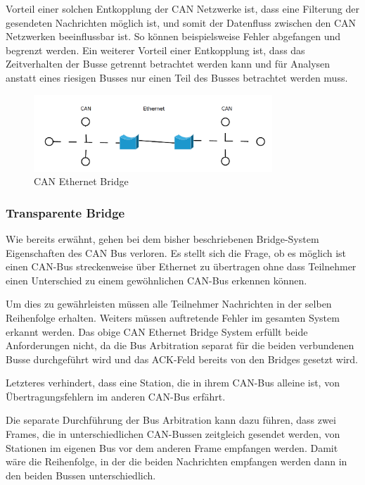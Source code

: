 Vorteil einer solchen Entkopplung der CAN Netzwerke ist, dass eine Filterung der gesendeten 
Nachrichten möglich ist, und somit der Datenfluss zwischen den CAN Netzwerken beeinflussbar 
ist. So können beispielsweise Fehler abgefangen und begrenzt werden. Ein weiterer Vorteil 
einer Entkopplung ist, dass das Zeitverhalten der Busse getrennt betrachtet werden kann 
und für Analysen anstatt eines riesigen Busses nur einen Teil des Busses betrachtet werden 
muss.

\begin{figure}[h] 
\centering
\includegraphics[width=0.8\textwidth]{figures/can_bridge}
\caption{CAN Ethernet Bridge} 
\label{bridge}
\end{figure}

\subsubsection{Transparente Bridge}
\label{l:trans}

Wie bereits erwähnt, gehen bei dem bisher beschriebenen Bridge-System Eigenschaften
des CAN Bus verloren. Es stellt sich die Frage, ob es möglich ist einen CAN-Bus
streckenweise über Ethernet zu übertragen ohne dass Teilnehmer einen Unterschied zu
einem gewöhnlichen CAN-Bus erkennen können.

Um dies zu gewährleisten müssen alle Teilnehmer Nachrichten in der selben Reihenfolge
erhalten. Weiters müssen auftretende Fehler im gesamten System erkannt werden. Das
obige CAN Ethernet Bridge System erfüllt beide Anforderungen nicht, da die Bus
Arbitration separat für die beiden verbundenen Busse durchgeführt wird und das
ACK-Feld bereits von den Bridges gesetzt wird.

Letzteres verhindert, dass eine Station, die in ihrem CAN-Bus alleine ist, von
Übertragungsfehlern im anderen CAN-Bus erfährt.

Die separate Durchführung der Bus Arbitration kann dazu führen, dass zwei Frames, die
in unterschiedlichen CAN-Bussen zeitgleich gesendet werden, von Stationen im eigenen
Bus vor dem anderen Frame empfangen werden. Damit wäre die Reihenfolge, in der die
beiden Nachrichten empfangen werden dann in den beiden Bussen unterschiedlich.


